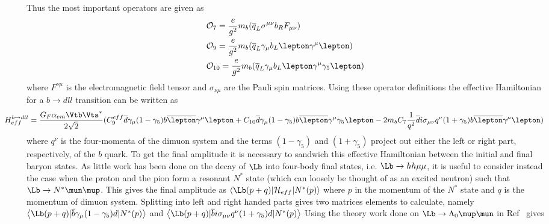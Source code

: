 Thus the most important operators are given as 
\begin{equation}
\begin{split}
&\mathcal{O}_{7} = \frac{e}{g^{2}}m_{b}(\overline{q}_{L}\sigma^{\mu\nu}b_{R}F_{\mu\nu})\\
&\mathcal{O}_{9} = \frac{e}{g^{2}}m_{b}(\overline{q}_{L}\gamma_{\mu}b_{L}\lepton\gamma^{\mu}\lepton)\\
&\mathcal{O}_{10} = \frac{e}{g^{2}}m_{b}(\overline{q}_{L}\gamma_{\mu}b_{L}\lepton\gamma^{\mu}\gamma_{5}\lepton)\\
\end{split}
\end{equation}
where $F^{\nu\mu}$ is the electromagnetic field tensor and $\sigma_{\nu\mu}$ are the Pauli spin matrices. Using these operator definitions the effective Hamiltonian for a $b\to dll$ transition can be written as
\begin{equation}
\hspace*{-1cm}
H^{b\to dll}_{eff} = \frac{G_{F}\alpha_{em}\Vtb\Vts^{*}}{2\sqrt{2}}(C_{9}^{eff}\overline{d}\gamma_{\mu}(1 - \gamma_{5})b\overline{\lepton}\gamma^{\mu}\lepton + C_{10}\overline{d}\gamma_{\mu}(1-\gamma_{5})b\overline{\lepton}\gamma^{\mu}\gamma_{5}\lepton - 2m_{b}C_{7}\frac{1}{q^{2}}\overline{d}i\sigma_{\mu\nu}q^{\nu}(1+\gamma_{5})b\overline{\lepton}\gamma^{\mu}\lepton)
\end{equation}
where $q^{\nu}$ is the four-momenta of the dimuon system and the terms $(1-\gamma_{5})$ and $(1+\gamma_{5})$ project out either the left or right part, respectively,  of the $b$ quark.
To get the final amplitude it is necessary to sandwich this effective Hamiltonian between the initial and final baryon states. As little work has been done on the decay of $\Lb$ into four-body final states, i.e. $\Lb\to h h \mu\mu$, it is useful to consider instead the case when the proton and the pion form a resonant $N^{*}$ state (which can loosely be thought of as an excited neutron) such that $\Lb\to N^{*}\mun\mup$. This gives the final amplitude as $\left<\Lb(p+q)|\mathcal{H}_{eff}|N^{*}(p)\right>$ where $p$ in the momentum of the $N^{*}$ state and $q$ is the momentum of dimuon system. Splitting into left and right handed parts gives two matrices elements to calculate, namely $\left<\Lb(p+q)|\overline{b}\gamma_{\mu}(1-\gamma_{5})d|N^{*}(p)\right>$ and $\left<\Lb(p+q)|\overline{b}i\sigma_{\mu\nu}q^{\nu}(1+\gamma_{5})d|N^{*}(p)\right>$  Using the theory work done on $\Lb\to\Lambda_{0}\mup\mun$ in Ref~\cite{lbtolmumu} gives %
